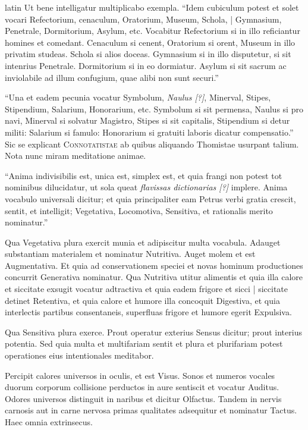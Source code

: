 \begin{otherlanguage*}{latin}
\pstart
 Ut bene intelligatur multiplicabo exempla. \enquote{Idem cubiculum potest et solet vocari Refectorium, cenaculum, Oratorium, Museum, Schola, \textnormal{|} Gymnasium, Penetrale, Dormitorium, Asylum, etc. Vocabitur Refectorium si in illo reficiantur homines et comedant. Cenaculum si cenent, Οratorium si orent, Museum in illo privatim studeas. Schola si alios doceas. Gymnasium si in illo disputetur, si sit intenrius Penetrale. Dormitorium si in eo dormiatur. Asylum si sit sacrum ac inviolabile ad illum confugium, quae alibi non sunt securi.} 
\pend

\pstart
 \enquote{Una et eadem pecunia vocatur Symbolum, \emph{Naulus [?]}, Minerval, Stipes, Stipendium, Salarium, Honorarium, etc. Symbolum si sit permensa, Naulus si pro navi, Minerval si solvatur Magistro, Stipes si sit capitalis, Stipendium si detur militi: Salarium si famulo: Honorarium si gratuiti laboris dicatur compensatio.} Sic se explicant \textsc{Connotatistae}\index[persons]{} ab quibus aliquando Thomistae usurpant talium. Nota nunc miram meditatione animae. 
\pend

\pstart
 \enquote{Anima indivisibilis est, unica est, simplex est, et quia frangi non potest tot nominibus dilucidatur, ut sola queat \emph{flavissas dictionarias [?]} implere. Anima vocabulo universali dicitur; et quia principaliter eam Petrus verbi gratia crescit, sentit, et intelligit; Vegetativa, Locomotiva, Sensitiva, et rationalis merito nominatur.}  
\pend

\pstart
 Qua Vegetativa plura exercit munia et adipiscitur multa vocabula. Adauget substantiam materialem et nominatur Nutritiva. Auget molem et est Augmentativa. Et quia ad conservationem speciei et novas hominum productiones concurrit Generativa nominatur. Qua Nutritiva utitur alimentis et quia illa calore et siccitate exsugit vocatur adtractiva et quia eadem frigore et sicci \textnormal{|}   siccitate detinet Retentiva, et quia calore et humore illa concoquit Digestiva, et quia interlectis partibus consentaneis, superfluas frigore et humore egerit Expulsiva. 
\pend

\pstart
 Qua Sensitiva plura exerce. Prout operatur exterius Sensus dicitur; prout interius potentia. Sed quia multa et multifariam sentit et plura et plurifariam potest operationes eius intentionales meditabor. 
\pend

\pstart
 Percipit calores universos in oculis, et est Visus. Sonos et numeros vocales duorum corporum collisione perductos in aure sentiscit et vocatur Auditus. Odores universos distinguit in naribus et dicitur Olfactus. Tandem in nervis carnosis aut in carne nervosa primas qualitates adsequitur et nominatur Tactus. Haec omnia extrinsecus. 
\pend


\end{otherlanguage*}
